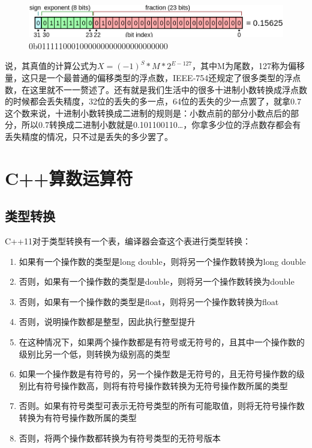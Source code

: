 \begin{figure}[!hbt]
\centering
\includegraphics[scale=0.4]{./Figures/Float}
\caption{0b0111110001000000000000000000000}
\label{figure:Float}
\end{figure}

\noindent 说，其真值的计算公式为$X=(-1)^S*M*2^{E-127}$，其中M为尾数，127称为偏移量，这只是一个最普通的偏移类型的浮点数，IEEE-754还规定了很多类型的浮点数，在这里就不一一赘述了。还有就是我们生活中的很多十进制小数转换成浮点数的时候都会丢失精度，32位的丢失的多一点，64位的丢失的少一点罢了，就拿0.7这个数来说，十进制小数转换成二进制的规则是：小数点前的部分小数点后的部分，所以0.7转换成二进制小数就是0.101100110\dots，你拿多少位的浮点数存都会有丢失精度的情况，只不过是丢失的多少罢了。

\section{C++算数运算符}

\addtocounter{subsection}{3}

\subsection{类型转换}

C++11对于类型转换有一个表，编译器会查这个表进行类型转换：

\begin{enumerate}
\item 如果有一个操作数的类型是long double，则将另一个操作数转换为long double
\item 否则，如果有一个操作数的类型是double，则将另一个操作数转换为double
\item 否则，如果有一个操作数的类型是f\/loat，则将另一个操作数转换为f\/loat
\item 否则，说明操作数都是整型，因此执行整型提升
\item 在这种情况下，如果两个操作数都是有符号或无符号的，且其中一个操作数的级别比另一个低，则转换为级别高的类型
\item 如果一个操作数是有符号的，另一个操作数是无符号的，且无符号操作数的级别比有符号操作数高，则将有符号操作数转换为无符号操作数所属的类型
\item 否则。如果有符号类型可表示无符号类型的所有可能取值，则将无符号操作数转换为有符号操作数所属的类型
\item 否则，将两个操作数都转换为有符号类型的无符号版本
\end{enumerate}\mbox{}

